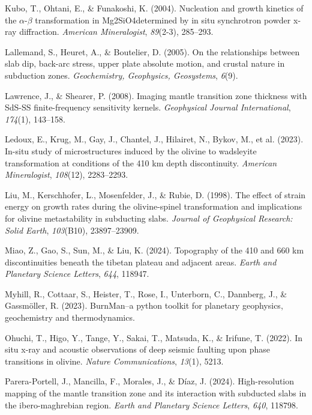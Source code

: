 \documentclass[draft,linenumbers]{agujournal2019}
\newlength{\cslhangindent}
\newenvironment{CSLReferences}[2]
 {\begin{list}{}{
  \setlength{\itemindent}{0pt}
  \setlength{\leftmargin}{0pt}
  \setlength{\parsep}{0pt}
  \ifodd #1
   \setlength{\leftmargin}{\cslhangindent}
   \setlength{\itemindent}{-\cslhangindent}
  \fi
  \setlength{\itemsep}{#2\baselineskip}
  }
  \item\relax}
 {\end{list}}
\begin{document}
\begin{CSLReferences}{1}{0}
Kubo, T., Ohtani, E., \& Funakoshi, K. (2004). Nucleation and growth
kinetics of the \(\alpha\)-\(\beta\) transformation in Mg2SiO4determined
by in situ synchrotron powder x-ray diffraction. \emph{American
Mineralogist}, \emph{89}(2-3), 285--293.

Lallemand, S., Heuret, A., \& Boutelier, D. (2005). On the relationships
between slab dip, back-arc stress, upper plate absolute motion, and
crustal nature in subduction zones. \emph{Geochemistry, Geophysics,
Geosystems}, \emph{6}(9).

Lawrence, J., \& Shearer, P. (2008). Imaging mantle transition zone
thickness with SdS-SS finite-frequency sensitivity kernels.
\emph{Geophysical Journal International}, \emph{174}(1), 143--158.

{Ledoux, E., Krug, M., Gay, J., Chantel, J., Hilairet, N., Bykov, M., et
al.} (2023). In-situ study of microstructures induced by the olivine to
wadsleyite transformation at conditions of the 410 km depth
discontinuity. \emph{American Mineralogist}, \emph{108}(12), 2283--2293.

Liu, M., Kerschhofer, L., Mosenfelder, J., \& Rubie, D. (1998). The
effect of strain energy on growth rates during the olivine-spinel
transformation and implications for olivine metastability in subducting
slabs. \emph{Journal of Geophysical Research: Solid Earth},
\emph{103}(B10), 23897--23909.

Miao, Z., Gao, S., Sun, M., \& Liu, K. (2024). Topography of the 410 and
660 km discontinuities beneath the tibetan plateau and adjacent areas.
\emph{Earth and Planetary Science Letters}, \emph{644}, 118947.

Myhill, R., Cottaar, S., Heister, T., Rose, I., Unterborn, C., Dannberg,
J., \& Gassmöller, R. (2023). BurnMan--a python toolkit for planetary
geophysics, geochemistry and thermodynamics.

Ohuchi, T., Higo, Y., Tange, Y., Sakai, T., Matsuda, K., \& Irifune, T.
(2022). In situ x-ray and acoustic observations of deep seismic faulting
upon phase transitions in olivine. \emph{Nature Communications},
\emph{13}(1), 5213.

Parera-Portell, J., Mancilla, F., Morales, J., \& Díaz, J. (2024).
High-resolution mapping of the mantle transition zone and its
interaction with subducted slabs in the ibero-maghrebian region.
\emph{Earth and Planetary Science Letters}, \emph{640}, 118798.


\end{CSLReferences}
\end{document}
